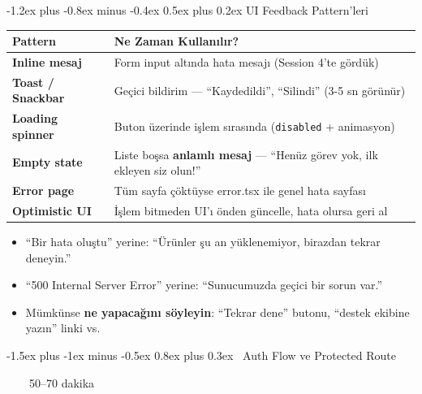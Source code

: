 \documentclass[12pt, a4paper]{article}
\makeatletter
\renewcommand{\section}{%
  \@startsection{section}{1}{\z@}%
    {-1.5ex plus -1ex minus -0.5ex}%
    {0.8ex plus 0.3ex}%
    {\normalfont\Large\bfseries\sffamily\color{primary}}%
}
\renewcommand{\subsection}{%
  \@startsection{subsection}{2}{\z@}%
    {-1.2ex plus -0.8ex minus -0.4ex}%
    {0.5ex plus 0.2ex}%
    {\normalfont\large\bfseries\sffamily\color{secondary}}%
}
\newcommand{\timebadge}[1]{%
  \noindent
  \colorbox{primary}{\color{white}\sffamily\bfseries\small\strut~~\faStopwatch~~#1~~}%
  \par\vspace{4pt}%
}
\makeatother
\begin{document}
\vspace{6pt}

\subsection{UI Feedback Pattern'leri}

\begin{tcolorbox}[enhanced, colback=lightbg, colframe=gray!30, arc=4pt]
\sffamily\small
\begin{tabularx}{\textwidth}{>{\bfseries\color{primary}}l X}
\toprule
Pattern & Ne Zaman Kullanılır? \\
\midrule
Inline mesaj &
  Form input altında hata mesajı (Session 4'te gördük) \\[4pt]
Toast / Snackbar &
  Geçici bildirim --- ``Kaydedildi'', ``Silindi'' (3-5 sn görünür) \\[4pt]
Loading spinner &
  Buton üzerinde işlem sırasında (\texttt{disabled} + animasyon) \\[4pt]
Empty state &
  Liste boşsa \textbf{anlamlı mesaj} --- ``Henüz görev yok, ilk ekleyen siz olun!'' \\[4pt]
Error page &
  Tüm sayfa çöktüyse error.tsx ile genel hata sayfası \\[4pt]
Optimistic UI &
  İşlem bitmeden UI'ı önden güncelle, hata olursa geri al \\
\bottomrule
\end{tabularx}
\end{tcolorbox}

\vspace{6pt}

\begin{warningbox}
\begin{itemize}
  \item ``Bir hata oluştu'' yerine: ``Ürünler şu an yüklenemiyor, birazdan tekrar deneyin.''
  \item ``500 Internal Server Error'' yerine: ``Sunucumuzda geçici bir sorun var.''
  \item Mümkünse \textbf{ne yapacağını söyleyin}: ``Tekrar dene'' butonu, ``destek ekibine yazın'' linki vs.
\end{itemize}
\end{warningbox}

\newpage
\section{\faLock\ Auth Flow ve Protected Route}
\timebadge{50--70 dakika}
\end{document}

